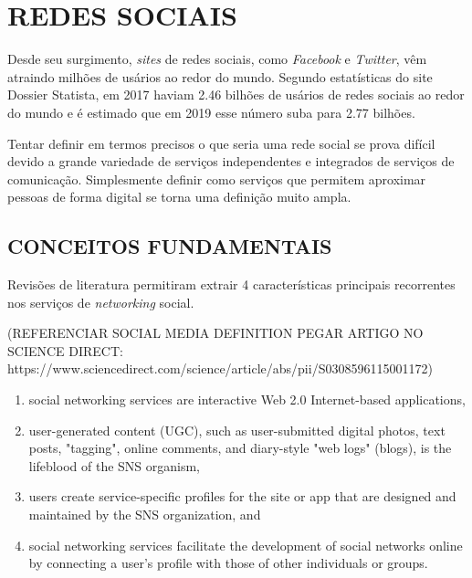 
%

\chapter{REDES SOCIAIS}
\label{chap:redesSociais}
Desde seu surgimento, \textit{sites} de redes sociais, como \textit{Facebook} e \textit{Twitter}, vêm atraindo milhões de usários ao redor do mundo. Segundo estatísticas do site Dossier Statista, em 2017 haviam 2.46 bilhões de usários de redes sociais ao redor do mundo e é estimado que em 2019 esse número suba para 2.77 bilhões.

Tentar definir em termos precisos o que seria uma rede social se prova difícil devido a grande variedade de serviços independentes e integrados de serviços de comunicação. Simplesmente definir como serviços que permitem aproximar pessoas de forma digital se torna uma definição muito ampla.

\section{CONCEITOS FUNDAMENTAIS}
\label{sec:conceitosRedesSociais}
 Revisões de literatura permitiram extrair 4 características principais recorrentes nos serviços de \textit{networking} social.

(REFERENCIAR SOCIAL MEDIA DEFINITION PEGAR ARTIGO NO SCIENCE DIRECT: https://www.sciencedirect.com/science/article/abs/pii/S0308596115001172)

\begin{enumerate}
	\item social networking services are interactive Web 2.0 Internet-based applications,
	\item user-generated content (UGC), such as user-submitted digital photos, text posts, "tagging", online comments, and diary-style "web logs" (blogs), is the lifeblood of the SNS organism,
	\item users create service-specific profiles for the site or app that are designed and maintained by the SNS organization, and
	\item social networking services facilitate the development of social networks online by connecting a user's profile with those of other individuals or groups.
\end{enumerate}

